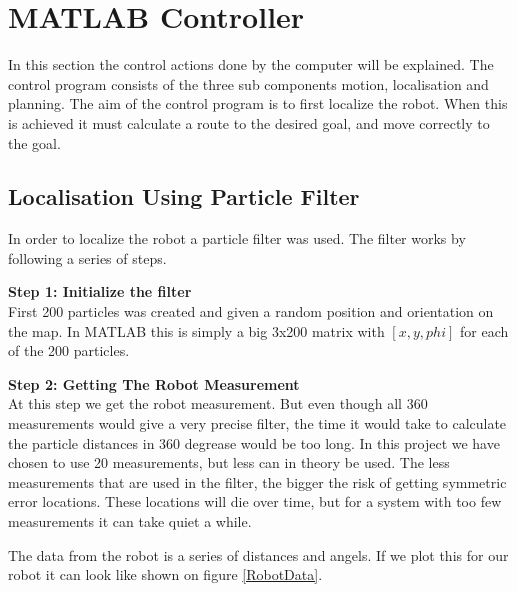 \section{MATLAB Controller}
In this section the control actions done by the computer will be explained. The control program consists of the three sub components motion, localisation and planning. The aim of the control program is to first localize the robot. When this is achieved it must calculate a route to the desired goal, and move correctly to the goal. 



\subsection{Localisation Using Particle Filter}
In order to localize the robot a particle filter was used. The filter works by following a series of steps. 

\textbf{Step 1: Initialize the filter}\\
First 200 particles was created and given a random position and orientation on the map. In MATLAB this is simply a big 3x200 matrix with $[x, y, phi]$ for each of the 200 particles. 

\textbf{Step 2: Getting The Robot Measurement}\\
At this step we get the robot measurement. But even though all 360 measurements would give a very precise filter, the time it would take to calculate the particle distances in 360 degrease would be too long. In this project we have chosen to use 20 measurements, but less can in theory be used. The less measurements that are used in the filter, the bigger the risk of getting symmetric error locations. These locations will die over time, but for a system with too few measurements it can take quiet a while. 

The data from the robot is a series of distances and angels. If we plot this for our robot it can look like shown on figure \ref{RobotData}.

